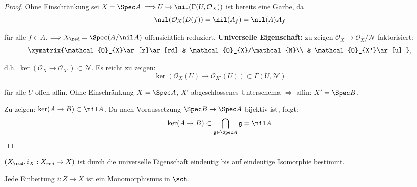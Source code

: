 \begin{proof}
  Ohne Einschränkung sei $X=\Spec A$ $\Longrightarrow U\mapsto\nil(\Gamma(U,\mathcal{O}_{X}))$
  ist bereits eine Garbe, da 
  \[
    \nil(\mathcal{O}_{X}(D(f))=\nil(A_{f})=\nil(A)A_{f}
  \]

  für alle $f\in A$. $\Longrightarrow X_{\red}=\Spec(A/\nil A)$ offensichtlich
  reduziert.\textbf{ Universelle Eigenschaft:} zu zeigen $\mathcal{O}_{X}\rightarrow\mathcal{O}_{X}/\mathcal{N}$
  faktorisiert:
  \[
    \xymatrix{\mathcal{O}_{X}\ar[r]\ar[rd] & \mathcal{O}_{X}/\mathcal{N}\\
      & \mathcal{O}_{X'}\ar[u]
    }
    ,
  \]

  d.h. $\ker(\mathcal{O}_{X}\rightarrow\mathcal{O}_{X'})\subset\mathcal{N}$.
  Es reicht zu zeigen:
  \[
    \ker(\mathcal{O}_{X}(U)\rightarrow\mathcal{O}_{X'}(U))\subset\Gamma(U,\mathcal{N})
  \]

  für alle $U$ offen affin. Ohne Einschränkung $X=\Spec A$, $X'$
  abgeschlossenes Unterschema $\Longrightarrow$ affin: $X'=\Spec B$.

  Zu zeigen: $\ker(A\rightarrow B)\subset\nil A$. Da nach Voraussetzung
  $\Spec B\rightarrow\Spec A$ bijektiv ist, folgt:
  \[
    \ker(A\rightarrow B)\subset\bigcap_{\mathfrak{g}\in\Spec A}\mathfrak{g}=\nil A
  \]
\end{proof}
\begin{cor}[45]
  $(X_{\red},i_{X}:X_{red}\rightarrow X)$ ist durch die universelle
  Eigenschaft eindeutig bis auf eindeutige Isomorphie bestimmt.
\end{cor}

\begin{lem}[46]
  Jede Einbettung $i:Z\rightarrow X$ ist ein Monomorphismus in $\sch$.
\end{lem}


